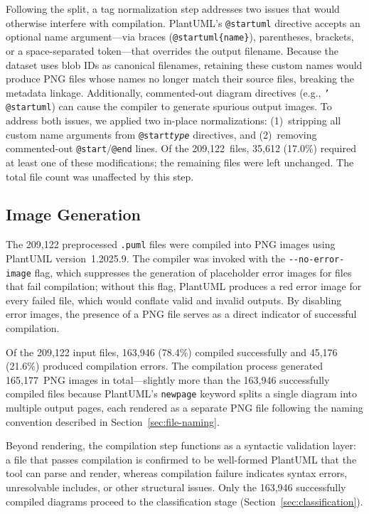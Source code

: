 \documentclass[11pt]{article}
\begin{document}
Following the split, a tag normalization step addresses two issues that would otherwise interfere with compilation. PlantUML's \texttt{@startuml} directive accepts an optional name argument---via braces (\texttt{@startuml\{name\}}), parentheses, brackets, or a space-separated token---that overrides the output filename. Because the dataset uses blob IDs as canonical filenames, retaining these custom names would produce PNG files whose names no longer match their source files, breaking the metadata linkage. Additionally, commented-out diagram directives (e.g., \texttt{'\,@startuml}) can cause the compiler to generate spurious output images. To address both issues, we applied two in-place normalizations: (1)~stripping all custom name arguments from \texttt{@start\textit{type}} directives, and (2)~removing commented-out \texttt{@start}/\texttt{@end} lines. Of the 209,122~files, 35,612 (17.0\%) required at least one of these modifications; the remaining files were left unchanged. The total file count was unaffected by this step.

\subsection{Image Generation}
\label{sec:image-generation}

The 209,122 preprocessed \texttt{.puml} files were compiled into PNG images using PlantUML version~1.2025.9. The compiler was invoked with the \texttt{-{}-no-error-image} flag, which suppresses the generation of placeholder error images for files that fail compilation; without this flag, PlantUML produces a red error image for every failed file, which would conflate valid and invalid outputs. By disabling error images, the presence of a PNG file serves as a direct indicator of successful compilation.

Of the 209,122 input files, 163,946 (78.4\%) compiled successfully and 45,176 (21.6\%) produced compilation errors. The compilation process generated 165,177~PNG images in total---slightly more than the 163,946 successfully compiled files because PlantUML's \texttt{newpage} keyword splits a single diagram into multiple output pages, each rendered as a separate PNG file following the naming convention described in Section~\ref{sec:file-naming}.

Beyond rendering, the compilation step functions as a syntactic validation layer: a file that passes compilation is confirmed to be well-formed PlantUML that the tool can parse and render, whereas compilation failure indicates syntax errors, unresolvable includes, or other structural issues. Only the 163,946 successfully compiled diagrams proceed to the classification stage (Section~\ref{sec:classification}).
\end{document}
